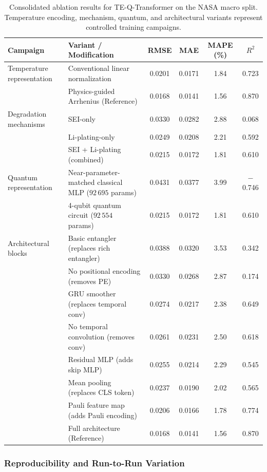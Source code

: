 \documentclass[a4paper,fleqn]{cas-sc}
\begin{document}
\begin{table}[t]
\centering
\small\setlength{\tabcolsep}{2.2pt}
\caption{Consolidated ablation results for TE-Q-Transformer on the NASA macro split. Temperature encoding, mechanism, quantum, and architectural variants represent controlled training campaigns.}\label{tab:physics}
\begin{tabular}{@{}llcccc@{}}
\toprule
Campaign & Variant / Modification & RMSE & MAE & MAPE (\%) & $R^2$ \\
\midrule
Temperature representation & Conventional linear normalization & 0.0201 & 0.0171 & 1.84 & 0.723 \\
 & Physics-guided Arrhenius (Reference) & 0.0168 & 0.0141 & 1.56 & 0.870 \\
\midrule
Degradation mechanisms & SEI-only & 0.0330 & 0.0282 & 2.88 & 0.068 \\
 & Li-plating-only & 0.0249 & 0.0208 & 2.21 & 0.592 \\
 & SEI + Li-plating (combined) & 0.0215 & 0.0172 & 1.81 & 0.610 \\
\midrule
Quantum representation & Near-parameter-matched classical MLP ($92\,695$ params) & 0.0431 & 0.0377 & 3.99 & $-$0.746 \\
 & 4-qubit quantum circuit ($92\,554$ params) & 0.0215 & 0.0172 & 1.81 & 0.610 \\
\midrule
Architectural blocks & Basic entangler (replaces rich entangler) & 0.0388 & 0.0320 & 3.53 & 0.342 \\
 & No positional encoding (removes PE) & 0.0330 & 0.0268 & 2.87 & 0.174 \\
 & GRU smoother (replaces temporal conv) & 0.0274 & 0.0217 & 2.38 & 0.649 \\
 & No temporal convolution (removes conv) & 0.0261 & 0.0231 & 2.50 & 0.618 \\
 & Residual MLP (adds skip MLP) & 0.0255 & 0.0214 & 2.29 & 0.545 \\
 & Mean pooling (replaces CLS token) & 0.0237 & 0.0190 & 2.02 & 0.565 \\
 & Pauli feature map (adds Pauli encoding) & 0.0206 & 0.0166 & 1.78 & 0.774 \\
 & Full architecture (Reference) & 0.0168 & 0.0141 & 1.56 & 0.870 \\
\bottomrule
\end{tabular}
\end{table}

\subsubsection{Reproducibility and Run-to-Run Variation}\label{sec:study_reproducibility}
\end{document}
